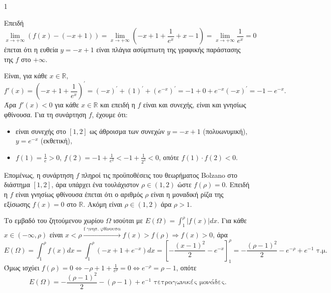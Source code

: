 \begin{ylh}{1}
    \item [Ύλη από εικόνα]
\end{ylh}
\begin{alist}
\item Επειδή
\[ \lim_{x \to +\infty} (f(x) - (-x+1)) = \lim_{x \to +\infty} \left(-x+1+\frac{1}{e^x} + x-1\right) = \lim_{x \to +\infty} \frac{1}{e^x} = 0 \]
έπεται ότι η ευθεία $y=-x+1$ είναι πλάγια ασύμπτωτη της γραφικής παράστασης της $f$ στο $+\infty$.

\item Είναι, για κάθε $x \in \mathbb{R}$,
\[ f'(x) = \left(-x+1+\frac{1}{e^x}\right)^{\prime} = (-x)^{\prime}+(1)^{\prime}+(e^{-x})^{\prime} = -1+0+e^{-x}(-x)^{\prime} = -1-e^{-x}. \]
Άρα $f'(x)<0$ για κάθε $x \in \mathbb{R}$ και επειδή η $f$ είναι και συνεχής, είναι και γνησίως φθίνουσα.
Για τη συνάρτηση $f$, έχουμε ότι:
\begin{itemize}
    \item είναι συνεχής στο $[1,2]$ ως άθροισμα των συνεχών $y=-x+1$ (πολυωνυμική), $y=e^{-x}$ (εκθετική),
    \item $f(1) = \frac{1}{e} > 0$, $f(2) = -1+\frac{1}{e^2} < -1+\frac{1}{2^2} < 0$, οπότε $f(1) \cdot f(2) < 0$.
\end{itemize}
Επομένως, η συνάρτηση $f$ πληροί τις προϋποθέσεις του θεωρήματος Bolzano στο διάστημα $[1,2]$, άρα υπάρχει ένα τουλάχιστον $\rho \in (1,2)$ ώστε $f(\rho)=0$.
Επειδή η $f$ είναι γνησίως φθίνουσα έπεται ότι ο αριθμός $\rho$ είναι η μοναδική ρίζα της εξίσωσης $f(x)=0$ στο $\mathbb{R}$. Ακόμη είναι $\rho \in (1,2)$ άρα $\rho > 1$.

\item Το εμβαδό του ζητούμενου χωρίου $\Omega$ ισούται με $E(\Omega) = \int_{1}^{\rho} |f(x)|dx$.
Για κάθε $x \in (-\infty, \rho)$ είναι $x < \rho \xrightarrow{\text{f γνησ. φθίνουσα}} f(x) > f(\rho) \Rightarrow f(x) > 0$, άρα
\[ E(\Omega) = \int_{1}^{\rho} f(x)dx = \int_{1}^{\rho} \left(-x+1+e^{-x}\right)dx = \left[-\frac{(x-1)^2}{2}-e^{-x}\right]_{1}^{\rho} = -\frac{(\rho-1)^2}{2}-e^{-\rho}+e^{-1} \text{ τ.μ.} \]
Όμως ισχύει $f(\rho)=0 \Leftrightarrow -\rho+1+\frac{1}{e^\rho}=0 \Leftrightarrow e^{-\rho}=\rho-1$, οπότε
\[ E(\Omega) = -\frac{(\rho-1)^2}{2}-(\rho-1)+e^{-1} \text{ τετραγωνικές μονάδες}. \]
\end{alist}